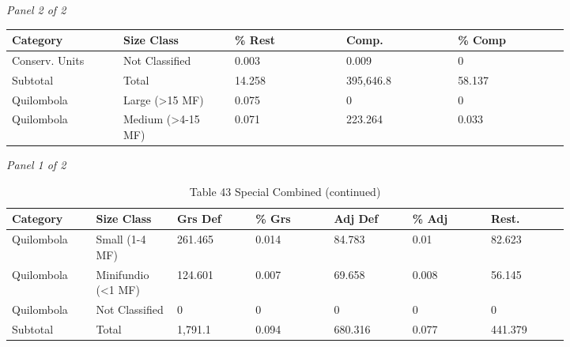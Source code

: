 \documentclass[12pt]{article}
\begin{document}
\begin{landscape}
\begin{table}[H]
\textit{Panel 2 of 2}\\[2pt]
{\fontsize{12}{14}\selectfont
\setlength{\tabcolsep}{3pt}
\renewcommand{\arraystretch}{1.08}
\begin{tabular}{p{0.164\linewidth}p{0.164\linewidth}p{0.164\linewidth}p{0.164\linewidth}p{0.164\linewidth}}
\toprule
Category & Size Class & \% Rest & Comp. & \% Comp \\
\midrule
Conserv. Units & Not Classified & 0.003 & 0.009 & 0 \\
Subtotal & Total & 14.258 & 395,646.8 & 58.137 \\
Quilombola & Large (>15 MF) & 0.075 & 0 & 0 \\
Quilombola & Medium (>4-15 MF) & 0.071 & 223.264 & 0.033 \\
\bottomrule
\end{tabular}
}
\end{table}
\begin{table}[H]
\centering
\caption{Table 43 Special Combined (continued)}
\textit{Panel 1 of 2}\\[2pt]
{\fontsize{12}{14}\selectfont
\setlength{\tabcolsep}{3pt}
\renewcommand{\arraystretch}{1.08}
\begin{tabular}{p{0.117\linewidth}p{0.117\linewidth}p{0.117\linewidth}p{0.117\linewidth}p{0.117\linewidth}p{0.117\linewidth}p{0.117\linewidth}}
\toprule
Category & Size Class & Grs Def & \% Grs & Adj Def & \% Adj & Rest. \\
\midrule
Quilombola & Small (1-4 MF) & 261.465 & 0.014 & 84.783 & 0.01 & 82.623 \\
Quilombola & Minifundio (<1 MF) & 124.601 & 0.007 & 69.658 & 0.008 & 56.145 \\
Quilombola & Not Classified & 0 & 0 & 0 & 0 & 0 \\
Subtotal & Total & 1,791.1 & 0.094 & 680.316 & 0.077 & 441.379 \\
\bottomrule
\end{tabular}
}

\vspace{0.6em}


\end{table}
\end{landscape}
\end{document}
